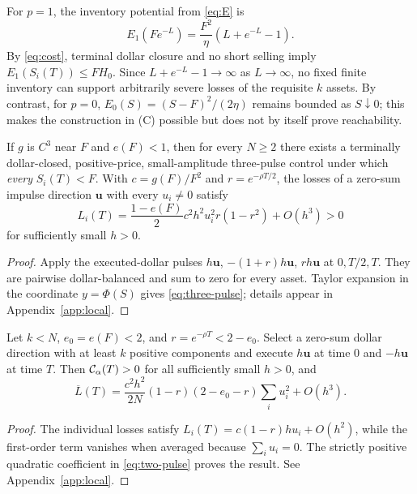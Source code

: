 \documentclass[review,hidelinks,onefignum,onetabnum]{siamonline250211}
\begin{document}
For $p=1$, the inventory potential from \eqref{eq:E} is
\begin{equation}\label{eq:inventoryb}
E_1(Fe^{-L})=\frac{F^2}{\eta}\left(L+e^{-L}-1\right).
\end{equation}
By \eqref{eq:cost}, terminal dollar closure and no short selling imply $E_1(S_i(T))\le FH_0$. Since $L+e^{-L}-1\to\infty$ as $L\to\infty$, no fixed finite inventory can support arbitrarily severe losses of the requisite $k$ assets. By contrast, for $p=0$, $E_0(S)=(S-F)^2/(2\eta)$ remains bounded as $S\downarrow0$; this makes the construction in (C) possible but does not by itself prove reachability.

\begin{proposition}\label{prop:three-pulse}
If $g$ is $C^3$ near $F$ and $e(F)<1$, then for every $N\ge2$ there exists a terminally dollar-closed, positive-price, small-amplitude three-pulse control under which \emph{every} $S_i(T)<F$. With $c=g(F)/F^2$ and $r=e^{-\rho T/2}$, the losses of a zero-sum impulse direction $\bm u$ with every $u_i\ne0$ satisfy
\begin{equation}\label{eq:three-pulse}
L_i(T)=\frac{1-e(F)}2c^2h^2u_i^2r(1-r^2)+O(h^3)>0
\end{equation}
for sufficiently small $h>0$.
\end{proposition}
\begin{proof}
Apply the executed-dollar pulses $h\bm u$, $-(1+r)h\bm u$, $rh\bm u$ at $0,T/2,T$. They are pairwise dollar-balanced and sum to zero for every asset. Taylor expansion in the coordinate $y=\Phi(S)$ gives \eqref{eq:three-pulse}; details appear in Appendix~\ref{app:local}.
\end{proof}

\begin{proposition}\label{prop:two-pulse}
Let $k<N$, $e_0=e(F)<2$, and $r=e^{-\rho T}<2-e_0$. Select a zero-sum dollar direction with at least $k$ positive components and execute $h\bm u$ at time $0$ and $-h\bm u$ at time $T$. Then $\mathcal{C}_\alpha(T)>0$ for all sufficiently small $h>0$, and
\begin{equation}\label{eq:two-pulse}
\overline L(T)=\frac{c^2h^2}{2N}(1-r)(2-e_0-r)\sum_iu_i^2+O(h^3).
\end{equation}
\end{proposition}
\begin{proof}
The individual losses satisfy $L_i(T)=c(1-r)hu_i+O(h^2)$, while the first-order term vanishes when averaged because $\sum_i u_i=0$. The strictly positive quadratic coefficient in \eqref{eq:two-pulse} proves the result. See Appendix~\ref{app:local}.
\end{proof}
\end{document}
